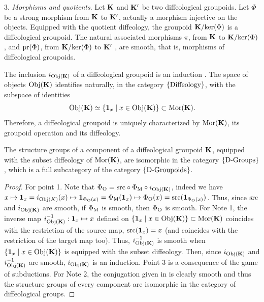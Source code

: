 \begin{article}
  3. {\em Morphisms and quotients}.
  Let ${\mathbf K}$ and ${\mathbf K}'$ be two diffeological groupoids.
  Let $\Phi$ be a strong morphism from ${\mathbf K}$ to ${\mathbf K}'$,
  actually a morphism injective on the objects.
  Equipped with the quotient diffeology,
  the groupoid ${\mathbf K}/\mathrm{ker}(\Phi)$ is a diffeological groupoid.
  The natural associated morphisms $\pi$, from ${\mathbf K}$ to ${\mathbf K}/\mathrm{ker}(\Phi)$,
  and $\mathrm{pr}(\Phi)$,
  from ${\mathbf K}/\mathrm{ker}(\Phi)$ to ${\mathbf K}'$ ,
  are smooth,
  that is,
  morphisms of diffeological groupoids.
  
   The inclusion $i_{{\operatorname{Obj}}({\mathbf K})}$ of a diffeological groupoid is an induction .
  The space of objects ${\operatorname{Obj}}({\mathbf K})$ identifies naturally,
  in the category $\{\operatorname{Diffeology}\}$,
  with the subspace of identities
  $$%
    \Obj(\KK) \simeq \{ \id_x  \mid x \in \Obj(\KK) \} \subset \Mor(\KK).
  $$%
  Therefore,
  a diffeological groupoid is uniquely characterized by ${\operatorname{Mor}}({\mathbf K})$,
  its groupoid operation and its diffeology.
  
   The structure groups of a component of a diffeological groupoid ${\mathbf K}$,
  equipped with the subset diffeology of ${\operatorname{Mor}}({\mathbf K})$,
  are isomorphic in the category $\{\operatorname{D-Groups}\}$,
  which is a full subcategory of the category $\{\operatorname{D-Groupoids}\}$.
\end{article} %

\begin{proof}
  For point 1.
  Note that $\Phi_{\mathrm{O}} = {\operatorname{src}} \circ \Phi_{\mathrm{M}} \circ i_{{\operatorname{Obj}}({\mathbf K})}$,
  indeed we have $x \mapsto {\bf 1}_x = i_{{\operatorname{Obj}}(K)}(x) \mapsto {\bf 1}_{\Phi_{\mathrm{O}}(x)} = \Phi_{\mathrm{M}}({\bf 1}_x) \mapsto \Phi_{\mathrm{O}}(x) = {\operatorname{src}}({\bf 1}_{\Phi_{\mathrm{O}}(x)})$.
  Thus,
  since ${\operatorname{src}}$ and $i_{{\operatorname{Obj}}({\mathbf K})}$ are smooth,
  if $\Phi_{\mathrm{M}}$ is smooth,
  then  $\Phi_{\mathrm{O}}$ is smooth.
  For Note 1,
  the inverse map $i_{{\operatorname{Obj}}({\mathbf K})}^{-1} : {\bf 1}_x \mapsto x$ defined on $\{{\bf 1}_x \mid x \in {\operatorname{Obj}}({\mathbf K})\} \subset {\operatorname{Mor}}({\mathbf K})$ coincides with the restriction of the source map,
  ${\operatorname{src}}({\bf 1}_x) =  x$ (and coincides with the restriction of the target map too).
  Thus,
  $i_{{\operatorname{Obj}}({\mathbf K})}^{-1}$ is smooth when $\{{\bf 1}_x \mid x \in {\operatorname{Obj}}({\mathbf K})\}$ is equipped with the subset diffeology.
  Then,
  since $i_{{\operatorname{Obj}}({\mathbf K})}$ and $i_{{\operatorname{Obj}}({\mathbf K})}^{-1}$ are smooth,
  $i_{{\operatorname{Obj}}({\mathbf K})}$ is an induction.
  Point 3 is a consequence of the game of subductions.
  For Note 2,
  the conjugation given in  is clearly smooth and thus the structure groups of every component are isomorphic in the category of diffeological groups.
\end{proof}

